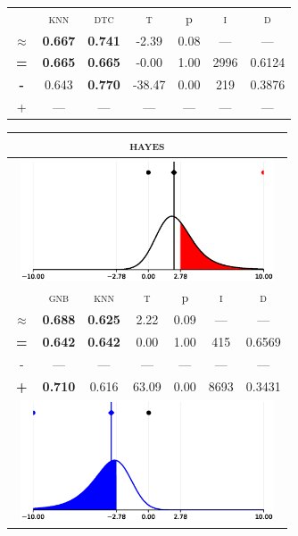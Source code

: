 \begin{tabular}{c||cc||c|c|c||c}
\midrule	&\textsc{knn} & \textsc{dtc} & \textsc{t} & p & \textsc{i} & \textsc{d}\\
	\color{black} $\approx$ & \color{black} \bfseries 0.667 &\color{black}  \bfseries 0.741 & -2.39 & 0.08 & --- & ---\\\midrule
	{\bfseries\color{black}\tiny=}& \color{black} \bfseries 0.665 & \color{black} \bfseries 0.665 & -0.00 & 1.00 & 2996 & \color{black} 0.6124\\
	{\bfseries\color{blue}\tiny-}& \color{blue}  0.643 & \color{blue} \bfseries 0.770 & -38.47 & 0.00 & 219 & \color{blue} 0.3876\\
	{\tiny+}& --- & --- & --- & --- & --- & ---\\
\bottomrule\end{tabular}


\begin{tabular}{c||cc||c|c|c||c}
	\toprule
	\multicolumn{7}{c}{\textsc{hayes}}\\
	\bottomrule
	\multicolumn{7}{c}{\includegraphics[width=7.5cm, trim=30 0 30 0]{figures/hayes_0.eps}}\\

\midrule	&\textsc{gnb} & \textsc{knn} & \textsc{t} & p & \textsc{i} & \textsc{d}\\
	\color{black} $\approx$ & \color{black} \bfseries 0.688 &\color{black}  \bfseries 0.625 & 2.22 & 0.09 & --- & ---\\\midrule
	{\bfseries\color{black}\tiny=}& \color{black} \bfseries 0.642 & \color{black} \bfseries 0.642 & 0.00 & 1.00 & 415 & \color{black} 0.6569\\
	{\tiny-}& --- & --- & --- & --- & --- & ---\\
	{\bfseries\color{red}\tiny+}& \color{red} \bfseries 0.710 & \color{red}  0.616 & 63.09 & 0.00 & 8693 & \color{red} 0.3431\\
	\bottomrule
	\multicolumn{7}{c}{\includegraphics[width=7.5cm, trim=30 0 30 0]{figures/hayes_1.eps}}\\


\end{tabular}
